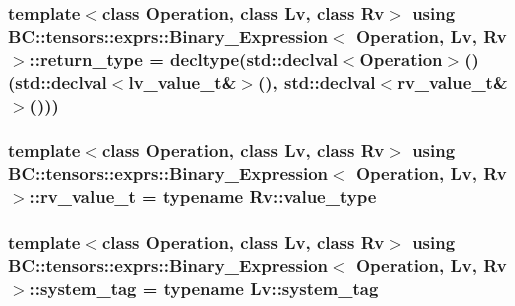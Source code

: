 \subsubsection[{\texorpdfstring{return\+\_\+type}{return_type}}]{\setlength{\rightskip}{0pt plus 5cm}template$<$class Operation, class Lv, class Rv$>$ using {\bf B\+C\+::tensors\+::exprs\+::\+Binary\+\_\+\+Expression}$<$ Operation, Lv, Rv $>$\+::{\bf return\+\_\+type} =  decltype(std\+::declval$<$Operation$>$()(std\+::declval$<${\bf lv\+\_\+value\+\_\+t}\&$>$(), std\+::declval$<${\bf rv\+\_\+value\+\_\+t}\&$>$()))}\hypertarget{structBC_1_1tensors_1_1exprs_1_1Binary__Expression_a5e8a6e43ec8cbba6a69d209589e02149}{}\label{structBC_1_1tensors_1_1exprs_1_1Binary__Expression_a5e8a6e43ec8cbba6a69d209589e02149}
\subsubsection[{\texorpdfstring{rv\+\_\+value\+\_\+t}{rv_value_t}}]{\setlength{\rightskip}{0pt plus 5cm}template$<$class Operation, class Lv, class Rv$>$ using {\bf B\+C\+::tensors\+::exprs\+::\+Binary\+\_\+\+Expression}$<$ Operation, Lv, Rv $>$\+::{\bf rv\+\_\+value\+\_\+t} =  typename Rv\+::value\+\_\+type}\hypertarget{structBC_1_1tensors_1_1exprs_1_1Binary__Expression_ad4a826a303397b65a2e04a8379278fa6}{}\label{structBC_1_1tensors_1_1exprs_1_1Binary__Expression_ad4a826a303397b65a2e04a8379278fa6}
\subsubsection[{\texorpdfstring{system\+\_\+tag}{system_tag}}]{\setlength{\rightskip}{0pt plus 5cm}template$<$class Operation, class Lv, class Rv$>$ using {\bf B\+C\+::tensors\+::exprs\+::\+Binary\+\_\+\+Expression}$<$ Operation, Lv, Rv $>$\+::{\bf system\+\_\+tag} =  typename Lv\+::system\+\_\+tag}\hypertarget{structBC_1_1tensors_1_1exprs_1_1Binary__Expression_ab11626c5e785f5ffab80a70d9beaa3e0}{}\label{structBC_1_1tensors_1_1exprs_1_1Binary__Expression_ab11626c5e785f5ffab80a70d9beaa3e0}
